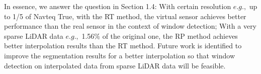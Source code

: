 In essence, we answer the question in Section 1.4: With certain resolution $e.g.,$ up to
1/5 of Navteq True, with the RT method, the virtual sensor achieves better performance than the real sensor in the context of window detection; With a very sparse LiDAR data $e.g.,$
1.56\% of the original one, the RP method achieves better interpolation results than the RT method. Future work is identified to improve the segmentation results for a better interpolation so that window detection on interpolated data from sparse LiDAR data will be feasible.





